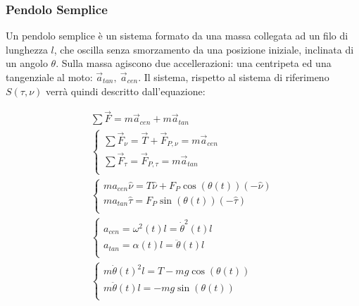 \documentclass{article}
\numberwithin{equation}{subsection}
\begin{document}
\subsubsection{Pendolo Semplice}
Un pendolo semplice è un sistema formato da una massa collegata 
ad un filo di lunghezza $l$, che oscilla senza smorzamento da una posizione iniziale, inclinata 
di un angolo $\theta$. Sulla massa agiscono due accellerazioni: 
una centripeta ed una tangenziale al moto: $\vec{a}_{tan},\:\vec{a}_{cen}$. 
Il sistema, rispetto al sistema di riferimeno $S(\tau,\nu)$ 
verrà quindi descritto dall'equazione:

\begin{gather*}
    \sum\vec{F}=m\vec{a}_{cen}+m\vec{a}_{tan}\\
    \begin{cases}
        \sum\vec{F}_{\nu}=\vec{T}+\vec{F}_{P,\nu}=m\vec{a}_{cen}\\
        \sum\vec{F}_{\tau}=\vec{F}_{P,\tau}=m\vec{a}_{tan}\\
    \end{cases}\\
    \begin{cases}
        ma_{cen}\hat{\nu}=T\hat{\nu}+F_P\cos(\theta(t))(-\hat{\nu})\\
        ma_{tan}\hat{\tau}=F_P\sin(\theta(t))(-\hat{\tau})\\
    \end{cases}\\
    \begin{cases}
        a_{cen}=\omega^{2}(t)l=\dot\theta^{2}(t)l\\
        a_{tan}=\alpha(t)l=\ddot\theta(t)l\\
    \end{cases}\\
    \begin{cases}
        m\dot\theta(t)^{2}l=T-mg\cos(\theta(t))\\
        m\ddot\theta(t)l=-mg\sin(\theta(t))\\
    \end{cases}
\end{gather*}
\end{document}
